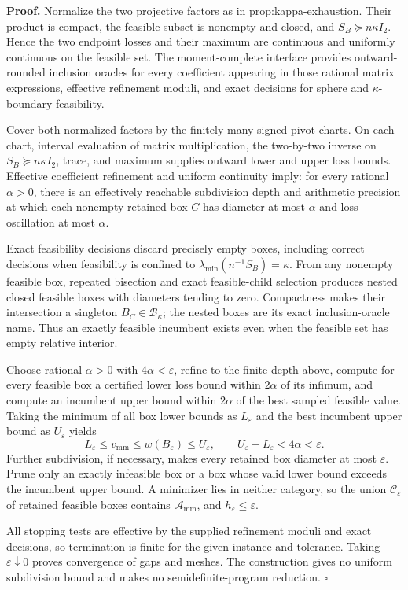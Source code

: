 \textbf{Proof.}
Normalize the two projective factors as in prop:kappa-exhaustion.  Their product is compact, the feasible subset is nonempty and closed, and \(S_B\succeq n\kappa I_2\).  Hence the two endpoint losses and their maximum are continuous and uniformly continuous on the feasible set.  The moment-complete interface provides outward-rounded inclusion oracles for every coefficient appearing in those rational matrix expressions, effective refinement moduli, and exact decisions for sphere and \(\kappa\)-boundary feasibility.

Cover both normalized factors by the finitely many signed pivot charts.  On each chart, interval evaluation of matrix multiplication, the two-by-two inverse on \(S_B\succeq n\kappa I_2\), trace, and maximum supplies outward lower and upper loss bounds.  Effective coefficient refinement and uniform continuity imply: for every rational \(\alpha>0\), there is an effectively reachable subdivision depth and arithmetic precision at which each nonempty retained box \(C\) has diameter at most \(\alpha\) and loss oscillation at most \(\alpha\).

Exact feasibility decisions discard precisely empty boxes, including correct decisions when feasibility is confined to \(\lambda_{\min}(n^{-1}S_B)=\kappa\).  From any nonempty feasible box, repeated bisection and exact feasible-child selection produces nested closed feasible boxes with diameters tending to zero.  Compactness makes their intersection a singleton \(B_C\in\mathcal B_\kappa\); the nested boxes are its exact inclusion-oracle name.  Thus an exactly feasible incumbent exists even when the feasible set has empty relative interior.

Choose rational \(\alpha>0\) with \(4\alpha<\varepsilon\), refine to the finite depth above, compute for every feasible box a certified lower loss bound within \(2\alpha\) of its infimum, and compute an incumbent upper bound within \(2\alpha\) of the best sampled feasible value.  Taking the minimum of all box lower bounds as \(L_\varepsilon\) and the best incumbent upper bound as \(U_\varepsilon\) yields
\[
 L_\varepsilon\le v_{\mathrm{mm}}\le w(B_\varepsilon)\le U_\varepsilon,
 \qquad U_\varepsilon-L_\varepsilon<4\alpha<\varepsilon.
\]
Further subdivision, if necessary, makes every retained box diameter at most \(\varepsilon\).  Prune only an exactly infeasible box or a box whose valid lower bound exceeds the incumbent upper bound.  A minimizer lies in neither category, so the union \(\mathcal C_\varepsilon\) of retained feasible boxes contains \(\mathcal A_{\mathrm{mm}}\), and \(h_\varepsilon\le\varepsilon\).

All stopping tests are effective by the supplied refinement moduli and exact decisions, so termination is finite for the given instance and tolerance.  Taking \(\varepsilon\downarrow0\) proves convergence of gaps and meshes.  The construction gives no uniform subdivision bound and makes no semidefinite-program reduction. \(\square\)